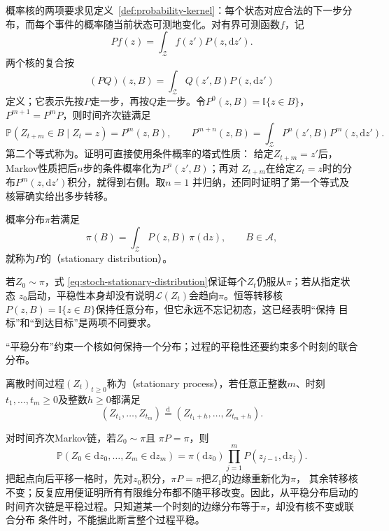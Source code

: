 概率核的两项要求见定义~\ref{def:probability-kernel}：每个状态对应合法的下一步分布，而每个事件的概率随当前状态可测地变化。对有界可测函数$f$，记
\[
  Pf(z)=\int_{\mathcal{Z}}f(z')P(z,\mathrm{d}z').
\]
两个核的复合按
\[
  (PQ)(z,B)
  =
  \int_{\mathcal{Z}}Q(z',B)P(z,\mathrm{d}z')
\]
定义；它表示先按$P$走一步，再按$Q$走一步。令$P^0(z,B)=\mathbb{I}\{z\in B\}$，
$P^{m+1}=P^mP$，则时间齐次链满足
\begin{equation}
  \mathbb{P}(Z_{t+m}\in B\mid Z_t=z)=P^m(z,B),
  \qquad
  P^{m+n}(z,B)
  =
  \int_{\mathcal{Z}}P^n(z',B)P^m(z,\mathrm{d}z').
  \label{eq:stoch-chapman-kolmogorov}
\end{equation}
第二个等式称为。证明可直接使用条件概率的塔式性质：
给定$Z_{t+m}=z'$后，Markov性质把后$n$步的条件概率化为$P^n(z',B)$；再对
$Z_{t+m}$在给定$Z_t=z$时的分布$P^m(z,\mathrm{d}z')$积分，就得到右侧。取$n=1$
并归纳，还同时证明了第一个等式及核幂确实给出多步转移。

\begin{definition}[平稳分布]
  \label{def:stoch-stationary-distribution}
概率分布$\pi$若满足
\begin{equation}
  \pi(B)=\int_{\mathcal{Z}}P(z,B)\,\pi(\mathrm{d}z),
  \qquad B\in\mathcal{A},
  \label{eq:stoch-stationary-distribution}
\end{equation}
就称为$P$的（stationary distribution）。
\end{definition}
若$Z_0\sim\pi$，式
\eqref{eq:stoch-stationary-distribution}保证每个$Z_t$仍服从$\pi$；若从指定状态
$z_0$启动，平稳性本身却没有说明$\mathcal{L}(Z_t)$会趋向$\pi$。恒等转移核
$P(z,B)=\mathbb{I}\{z\in B\}$保持任意分布，但它永远不忘记初态，这已经表明“保持
目标”和“到达目标”是两项不同要求。

“平稳分布”约束一个核如何保持一个分布；过程的平稳性还要约束多个时刻的联合分布。
\begin{definition}[平稳过程]
  \label{def:stoch-stationary-process}
  离散时间过程\((Z_t)_{t\geq0}\)称为（stationary process），若任意正整数\(m\)、时刻\(t_1,\ldots,t_m\geq0\)及整数\(h\geq0\)都满足
  \[ (Z_{t_1},\ldots,Z_{t_m})\overset{\mathrm d}{=}(Z_{t_1+h},\ldots,Z_{t_m+h}). \]
\end{definition}
对时间齐次Markov链，若$Z_0\sim\pi$且
$\pi P=\pi$，则
\[
  \mathbb{P}(Z_0\in\mathrm{d}z_0,\ldots,Z_m\in\mathrm{d}z_m)
  =
  \pi(\mathrm{d}z_0)
  \prod_{j=1}^{m}P(z_{j-1},\mathrm{d}z_j).
\]
把起点向后平移一格时，先对$z_0$积分，$\pi P=\pi$把$Z_1$的边缘重新化为$\pi$，
其余转移核不变；反复应用便证明所有有限维分布都不随平移改变。因此，从平稳分布启动的
时间齐次链是平稳过程。只知道某一个时刻的边缘分布等于$\pi$，却没有核不变或联合分布
条件时，不能据此断言整个过程平稳。

